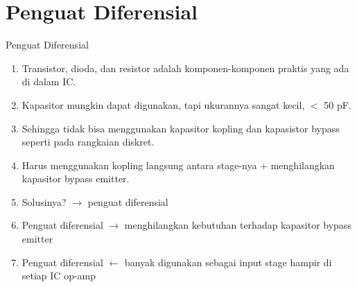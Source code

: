 \documentclass[aspectratio=169]{beamer}
\begin{document}
\section{Penguat Diferensial}
\begin{frame}{Penguat Diferensial}
	\begin{enumerate}
		\item Transistor, dioda, dan resistor adalah komponen-komponen praktis yang ada di dalam IC.
		\item Kapasitor mungkin dapat digunakan, tapi ukurannya sangat kecil, $ < $ 50 pF.
		\item Sehingga tidak bisa menggunakan kapasitor kopling dan  kapasistor bypass seperti pada rangkaian diskret.
		\item Harus menggunakan kopling langsung antara stage-nya + menghilangkan kapasitor bypass emitter.
		\item Solusinya? $ \rightarrow $ penguat diferensial
		\item Penguat diferensial $ \rightarrow $ menghilangkan kebutuhan terhadap kapasitor bypass emitter
		\item Penguat diferensial $ \leftarrow $ banyak digunakan sebagai input stage hampir di setiap IC op-amp
	\end{enumerate}
\end{frame}
\end{document}
